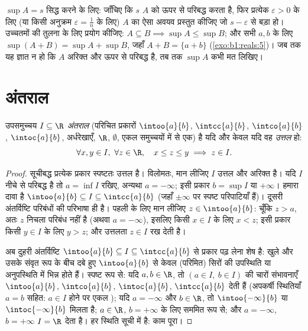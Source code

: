 \begin{method}\label{met:b1:reals:supproofs}
$\sup A = s$ सिद्ध करने के लिए: जाँचिए कि $s$ $A$ को ऊपर से परिबद्ध करता है,
फिर प्रत्येक $\varepsilon > 0$ के लिए (या किसी अनुक्रम $\varepsilon = \frac
1n$ के लिए) $A$ का ऐसा अवयव प्रस्तुत कीजिए जो $s - \varepsilon$ से बड़ा हो।
उच्चतमों की तुलना के लिए प्रयोग कीजिए: $A \subseteq B \implies \sup A \leq
\sup B$; और सभी $a, b$ के लिए $\sup(A + B) = \sup A + \sup B$, जहाँ $A + B =
\{a + b\}$ (\cref{exo:b1:reals:5})। जब तक यह ज्ञात न हो कि $A$ अरिक्त और ऊपर
से परिबद्ध है, तब तक $\sup A$ कभी मत लिखिए।
\end{method}

\section{अंतराल}

\begin{proposition}[अंतरालों का अभिलक्षण]\label{prop:b1:reals:intervals}
उपसमुच्चय $I \subseteq \R$ \emph{अंतराल} (परिचित प्रकारों
$\intoo{a}{b}$, $\intcc{a}{b}$, $\intco{a}{b}$, $\intoc{a}{b}$, अर्धरेखाएँ,
$\R$, $\emptyset$, एकल समुच्चयों में से एक) है यदि और केवल यदि वह
\emph{उत्तल} हो:
\[
\forall x, y \in I,\ \forall z \in \R, \quad
x \leq z \leq y \implies z \in I .
\]
\end{proposition}

\begin{proof}
सूचीबद्ध प्रत्येक प्रकार स्पष्टतः उत्तल है। विलोमतः, मान लीजिए $I$ उत्तल और
अरिक्त है। यदि $I$ नीचे से परिबद्ध है तो $a = \inf I$ रखिए, अन्यथा $a =
-\infty$; इसी प्रकार $b = \sup I$ या $+\infty$। हमारा दावा है $\intoo{a}{b}
\subseteq I \subseteq \intcc{a}{b}$ (जहाँ $\pm\infty$ पर स्पष्ट परिपाटियाँ
हैं)। दूसरी अंतर्विष्टि परिबंधों की परिभाषा ही है। पहली के लिए मान लीजिए $z
\in \intoo{a}{b}$: चूँकि $z > a$, अतः $z$ निचला परिबंध नहीं है (अथवा $a =
-\infty$), इसलिए किसी $x \in I$ के लिए $x < z$; इसी प्रकार किसी $y \in I$ के
लिए $y > z$; और उत्तलता $z \in I$ रख देती है।

अब दुहरी अंतर्विष्टि $\intoo{a}{b} \subseteq I \subseteq \intcc{a}{b}$ से
प्रकार पढ़ लेना शेष है: खुले  और उसके संवृत रूप के बीच दबे हुए 
$\intoo{a}{b}$ से केवल (परिमित) सिरों की उपस्थिति या अनुपस्थिति में भिन्न
होते हैं। स्पष्ट रूप से: यदि $a, b \in \R$, तो $(a \in I,\ b \in I)$ की
चारों संभावनाएँ $\intoo{a}{b}$, $\intco{a}{b}$, $\intoc{a}{b}$,
$\intcc{a}{b}$ देती हैं (अपकर्षी स्थितियाँ $a = b$ सहित: $a \in I$ होने पर
एकल ); यदि $a = -\infty$ और $b \in \R$, तो $\intoo{-\infty}{b}$ या
$\intoc{-\infty}{b}$ मिलता है; $a \in \R$, $b = +\infty$ के लिए सममित रूप
से; और $a = -\infty$, $b = +\infty$ $I = \R$ देता है। हर स्थिति सूची में है:
काम पूरा।
\end{proof}

